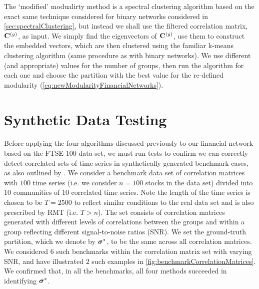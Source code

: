 The `modified' modualirty method is a spectral clustering algorithm based on the exact same technique considered for binary networks considered in \cref{sec:spectralClustering}, but instead we shall use the filtered correlation matrix, $\mathbf C^{(g)}$, as input.
We simply find the eigenvectors of $\mathbf C^{(g)}$, use them to construct the embedded vectors, which are then clustered using the familiar k-means clustering algorithm (same procedure as with binary networks).
We use different (and appropriate) values for the number of groups, then run the algorithm for each one and choose the partition with the best value for the re-defined modularity (\cref{eq:newModularityFinancialNetworks}).




\section{Synthetic Data Testing}
\label{sec:syntheticDataTesting}

Before applying the four algorithms discussed previously to our financial network based on the FTSE 100 data set, we must run tests to confirm we can correctly detect correlated sets of time series in synthetically generated benchmark cases, as also outlined by \cite{MG13}.
We consider a benchmark data set of correlation matrices with $100$ time series (i.e. we consider $n = 100$ stocks in the data set) divided into $10$ communities of $10$ correlated time series. Note the length of the time series is chosen to be $T=2500$ to reflect similar conditions to the real data set and is also prescribed by RMT (i.e. $T>n$).
The set consists of correlation matrices generated with different levels of correlations between the groups and within a group reflecting different signal-to-noise ratios (SNR). We set the ground-truth partition, which we denote by $\vecvar{\sigma}^{*}$, to be the same across all correlation matrices.
We considered $6$ such benchmarks within the correlation matrix set with varying SNR, and have illustrated $2$ such examples in \cref{fig:benchmarkCorrelationMatrices}.
We confirmed that, in all the benchmarks, all four methods succeeded in identifying $\vecvar{\sigma}^{*}$.

